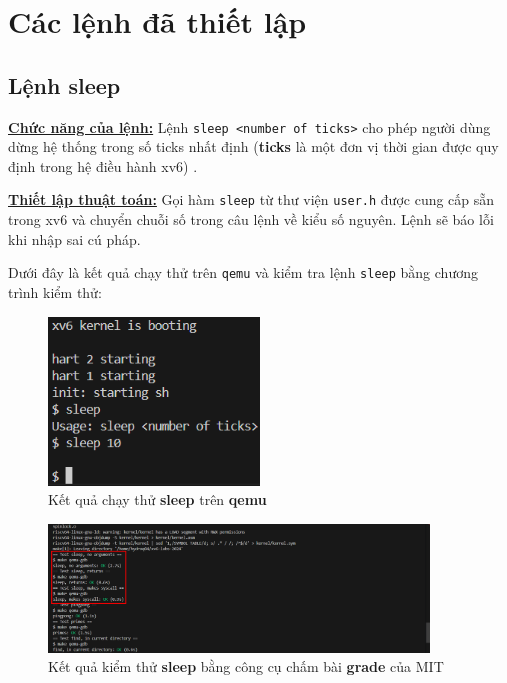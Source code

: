 \section{Các lệnh đã thiết lập}
\subsection{Lệnh sleep}
\underline{\textbf{Chức năng của lệnh:}} Lệnh \verb|sleep <number of ticks>| cho phép người dùng dừng hệ thống trong số ticks nhất định (\textbf{ticks} là một đơn vị thời gian được quy định trong hệ điều hành xv6) \cite{mit-xv6}.

\underline{\textbf{Thiết lập thuật toán:}} Gọi hàm \verb|sleep| từ thư viện \verb|user.h| được cung cấp sẵn trong xv6 và chuyển chuỗi số trong câu lệnh về kiểu số nguyên. Lệnh sẽ báo lỗi khi nhập sai cú pháp.

Dưới đây là kết quả chạy thử trên \verb|qemu| và kiểm tra lệnh \verb|sleep| bằng chương trình kiểm thử:
\begin{figure}[htp!]
	\centering
	\includegraphics[width=0.5\textwidth]{figures/exec-sleep}
	\caption{Kết quả chạy thử \textbf{sleep} trên \textbf{qemu}}
\end{figure}
\begin{figure}[htp!]
	\centering
	\includegraphics[width=0.9\textwidth]{figures/sleep-test}
	\caption{Kết quả kiểm thử \textbf{sleep} bằng công cụ chấm bài \textbf{grade} của MIT}
\end{figure}

\newpage